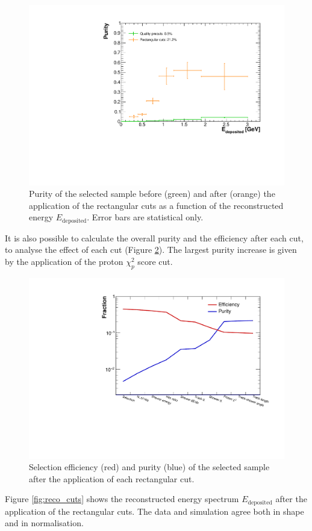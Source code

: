 \begin{figure}[htbp]
\centering
  \includegraphics[width=0.75\linewidth]{figures/purity_sel.pdf}
  \caption{Purity of the selected sample before (green) and after (orange) the application of the rectangular cuts as a function of the reconstructed energy $E_{\mathrm{deposited}}$. Error bars are statistical only.}\label{fig:purity_sel}
\end{figure}

It is also possible to calculate the overall purity and the efficiency after each cut, to analyse the effect of each cut (Figure \ref{fig:effpurity_cuts}). The largest purity increase is given by the application of the proton $\chi_{p}^2$ score cut. 

\begin{figure}[htbp]
\centering
  \includegraphics[width=0.75\linewidth]{figures/purity_eff.pdf}
  \caption{Selection efficiency (red) and purity (blue) of the selected sample after the application of each rectangular cut.}\label{fig:effpurity_cuts}
\end{figure}

Figure \ref{fig:reco_cuts} shows the reconstructed energy spectrum $E_{\mathrm{deposited}}$ after the application of the rectangular cuts. The data and simulation agree both in shape and in normalisation.

